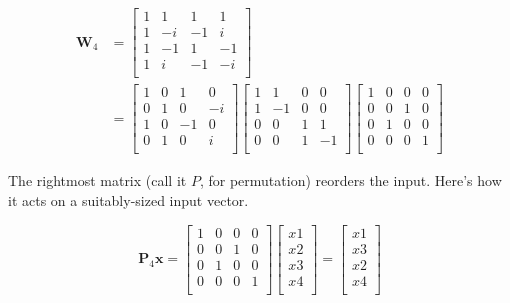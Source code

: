 \documentclass[
  letterpaper,
]{krantz}
\begin{document}
\[
\begin{aligned}
\mathbf{W}_4 
&=
\begin{bmatrix}
1 &   1  & 1 &  1\\
1 &   -i  & -1 &  i\\
1 &   -1  & 1 &  -1\\
1 &   i  & -1 &  -i\\
\end{bmatrix} \\ 
&=
\begin{bmatrix}
1 &   0  & 1 &  0\\
0 &   1  & 0 &  -i\\
1 &   0  & -1 &  0\\
0 &   1  & 0 &  i\\
\end{bmatrix}
\begin{bmatrix}
1 &   1  & 0 &  0\\
1 &   -1  &  0 &  0\\
0 &   0  & 1 &  1\\
0 &   0  & 1 &  -1\\
\end{bmatrix}
\begin{bmatrix}
1 &   0  & 0 &  0\\
0 &   0  & 1 &  0\\
0 &   1  & 0 &  0\\
0 &   0  & 0 &  1\\
\end{bmatrix}
\end{aligned}
\]

The rightmost matrix (call it \(P\), for permutation) reorders the
input. Here's how it acts on a suitably-sized input vector.

\[
\mathbf{P}_4 \mathbf{x}
=
\begin{bmatrix}
1 &   0  & 0 &  0\\
0 &   0  & 1 &  0\\
0 &   1  & 0 &  0\\
0 &   0  & 0 &  1\\
\end{bmatrix}
\begin{bmatrix}
x1 \\
x2 \\
x3 \\
x4 \\
\end{bmatrix}
=
\begin{bmatrix}
x1 \\
x3 \\
x2 \\
x4 \\
\end{bmatrix}
\]
\end{document}
